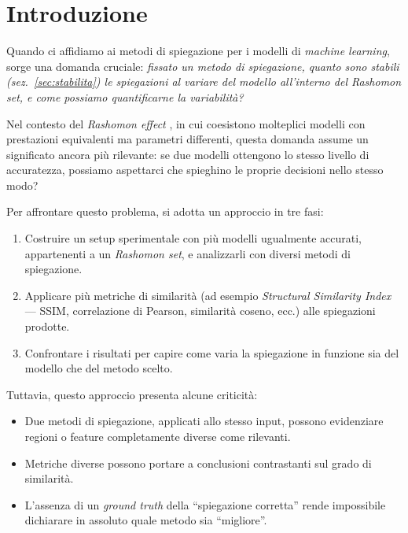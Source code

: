 \documentclass[12pt,a4paper,oneside]{report}
\numberwithin{figure}{chapter}
\numberwithin{table}{chapter}
\begin{document}
\tableofcontents

\newpage

\maketitle

\chapter{Introduzione}

Quando ci affidiamo ai metodi di spiegazione per i modelli di \emph{machine
      learning}, sorge una domanda cruciale: \textit{fissato un metodo di
      spiegazione, quanto sono stabili (sez.~\ref{sec:stabilita}) le spiegazioni al
      variare del modello all’interno del Rashomon set, e come possiamo quantificarne
      la variabilità?}

Nel contesto del \emph{Rashomon effect}
\cite{mueller2023rashomon,leventi2023consistency}, in cui coesistono molteplici
modelli con prestazioni equivalenti ma parametri differenti, questa domanda
assume un significato ancora più rilevante: se due modelli ottengono lo stesso
livello di accuratezza, possiamo aspettarci che spieghino le proprie decisioni
nello stesso modo?

Per affrontare questo problema, si adotta un approccio in tre fasi:
\begin{enumerate}
      \item Costruire un setup sperimentale con più modelli ugualmente accurati,
            appartenenti a un \emph{Rashomon set}, e analizzarli con diversi metodi di
            spiegazione.
      \item Applicare più metriche di similarità (ad esempio \emph{Structural Similarity
                  Index} — SSIM, correlazione di Pearson, similarità coseno, ecc.) alle
            spiegazioni prodotte.
      \item Confrontare i risultati per capire come varia la spiegazione in funzione sia
            del modello che del metodo scelto.
\end{enumerate}

Tuttavia, questo approccio presenta alcune criticità:
\begin{itemize}
      \item Due metodi di spiegazione, applicati allo stesso input, possono evidenziare
            regioni o feature completamente diverse come rilevanti.
      \item Metriche diverse possono portare a conclusioni contrastanti sul grado di
            similarità.
      \item L’assenza di un \emph{ground truth} della “spiegazione corretta” rende
            impossibile dichiarare in assoluto quale metodo sia “migliore”.
\end{itemize}
\end{document}
